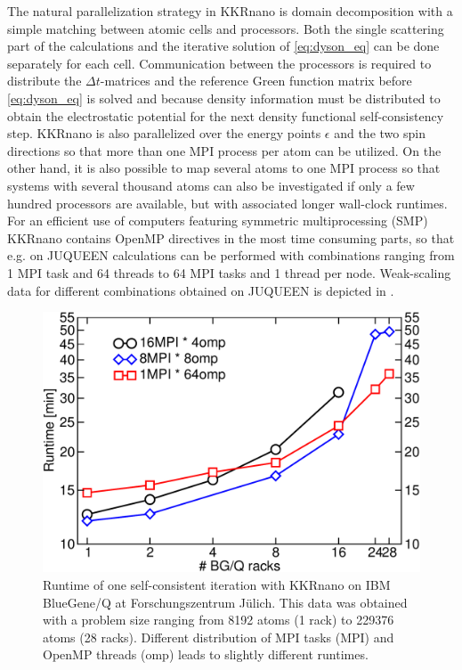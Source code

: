 \documentclass [a4paper, 12pt]{article}
\begin{document}
The natural parallelization strategy in KKRnano is domain decomposition with a simple 
matching between atomic cells and processors. Both the single scattering part of the 
calculations and the iterative solution of \cref{eq:dyson_eq} can be done separately for each cell. 
Communication between the processors is required to distribute the
$\Delta t$-matrices and the 
reference Green function matrix
before \cref{eq:dyson_eq} is solved and because density information
must be distributed to obtain the electrostatic potential for the next density functional
self-consistency step. KKRnano is also parallelized over the energy points $\epsilon$ and 
the two spin directions so that more than one MPI process per atom can be utilized.
On the other hand, it is also possible to map several atoms to one MPI process so that
systems with several thousand atoms can also be investigated if only a few hundred
processors are available, but with associated longer wall-clock runtimes.
\\
For an efficient use of computers featuring symmetric multiprocessing (SMP) KKRnano contains OpenMP directives
in the most time consuming parts, so that e.g. on JUQUEEN calculations can be performed with combinations 
ranging from 1 MPI task and 64 threads to 64 MPI tasks and 1 thread per node. Weak-scaling data
for different combinations
obtained on JUQUEEN is depicted in .
\begin{figure}[h]
\begin{center}
 \includegraphics[scale=0.45]{Figures/total_runtimes.pdf}
\end{center}
\caption{Runtime of one self-consistent iteration with KKRnano 
	on IBM BlueGene/Q at Forschungszentrum J{\"u}lich.
	This data was obtained with a problem size ranging from 8192 atoms (1 rack) to 229376 atoms (28 racks).
	Different distribution of MPI tasks (MPI) and OpenMP threads (omp) leads to slightly different runtimes.}
\label{fig:total_runtimes}
\end{figure}
\end{document}
